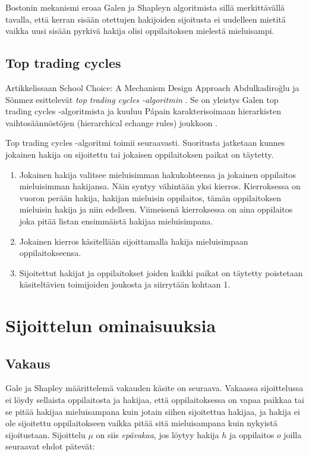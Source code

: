 \documentclass[gradu, twoside]{tktltiki}
\begin{document}
Bostonin mekanismi eroaa Galen ja Shapleyn algoritmista sillä
merkittävällä tavalla, että kerran sisään otettujen hakijoiden
sijoitusta ei uudelleen mietitä vaikka uusi sisään pyrkivä hakija
olisi oppilaitoksen mielestä mieluisampi.

\subsection{Top trading cycles}

Artikkelissaan School Choice: A Mechanism Design Approach
Abdulkadiroğlu ja Sönmez esittelevät \emph{top trading cycles
  -algoritmin} \cite{abdusön03}. Se on yleistys Galen top trading
cycles -algoritmista \cite{shapley74} ja kuuluu Pápain
karakterisoimaan hierarkisten vaihtosäännöstöjen (hierarchical echange
rules) joukkoon \cite{papai00}.

Top trading cycles -algoritmi toimii seuraavasti. Suoritusta jatketaan
kunnes jokainen hakija on sijoitettu tai jokaisen oppilaitoksen paikat
on täytetty.
\begin{enumerate}

\item Jokainen hakija valitsee mieluisimman hakukohteensa ja jokainen
  oppilaitos mieluisimman hakijansa. Näin syntyy vähintään yksi
  kierros. Kierroksessa on vuoron perään hakija, hakijan mieluisin
  oppilaitos, tämän oppilaitoksen mieluisin hakija ja niin edelleen.
  Viimeisenä kierroksessa on aina oppilaitos joka pitää listan
  ensimmäistä hakijaa mieluisimpana.

\item Jokainen kierros käsitellään sijoittamalla hakija mieluisimpaan
  oppilaitokseensa.

\item Sijoitettut hakijat ja oppilaitokset joiden kaikki paikat on
  täytetty poistetaan käsiteltävien toimijoiden joukosta ja siirrytään
  kohtaan 1.
\end{enumerate}

\section{Sijoittelun ominaisuuksia}

\subsection{Vakaus}

Gale ja Shapley määrittelemä vakauden käsite \cite{galeshapley62} on
seuraava. Vakaassa sijoittelussa ei löydy sellaista oppilaitosta ja
hakijaa, että oppilaitoksessa on vapaa paikkaa tai se pitää hakijaa
mieluisampana kuin jotain siihen sijoitettua hakijaa, ja hakija ei ole
sijoitettu oppilaitokseen vaikka pitää sitä mieluisampana kuin
nykyistä sijoitustaan. Sijoittelu $\mu$ on siis \emph{epävakaa}, jos
löytyy hakija $h$ ja oppilaitos $o$ joilla seuraavat ehdot pätevät:
\end{document}
